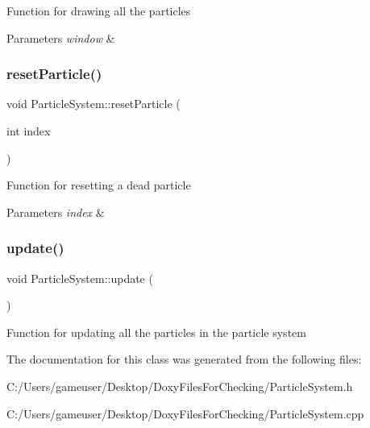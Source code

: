 Function for drawing all the particles 


\begin{DoxyParams}{Parameters}
{\em window} & \\
\hline
\end{DoxyParams}
\mbox{\label{class_particle_system_aa85c923212223e420dce6afb11a31cc6}} 
\subsubsection{\texorpdfstring{resetParticle()}{resetParticle()}}
{\footnotesize\ttfamily void Particle\+System\+::reset\+Particle (\begin{DoxyParamCaption}\item[{int}]{index }\end{DoxyParamCaption})\hspace{0.3cm}{\ttfamily [private]}}



Function for resetting a dead particle 


\begin{DoxyParams}{Parameters}
{\em index} & \\
\hline
\end{DoxyParams}
\mbox{\label{class_particle_system_a40e5ab5f279f0a0ec6b7b2812543d899}} 
\subsubsection{\texorpdfstring{update()}{update()}}
{\footnotesize\ttfamily void Particle\+System\+::update (\begin{DoxyParamCaption}{ }\end{DoxyParamCaption})}



Function for updating all the particles in the particle system 



The documentation for this class was generated from the following files\+:\begin{DoxyCompactItemize}
\item 
C\+:/\+Users/gameuser/\+Desktop/\+Doxy\+Files\+For\+Checking/Particle\+System.\+h\item 
C\+:/\+Users/gameuser/\+Desktop/\+Doxy\+Files\+For\+Checking/Particle\+System.\+cpp\end{DoxyCompactItemize}

